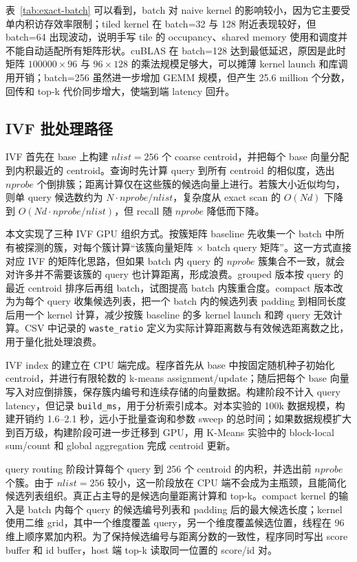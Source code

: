 \documentclass[10pt,a4paper]{article}
\begin{document}
表~\ref{tab:exact-batch} 可以看到，batch 对 naive kernel 的影响较小，因为它主要受单内积访存效率限制；tiled kernel 在 batch=32 与 128 附近表现较好，但 batch=64 出现波动，说明手写 tile 的 occupancy、shared memory 使用和调度并不能自动适配所有矩阵形状。cuBLAS 在 batch=128 达到最低延迟，原因是此时矩阵 $100000\times96$ 与 $96\times128$ 的乘法规模足够大，可以摊薄 kernel launch 和库调用开销；batch=256 虽然进一步增加 GEMM 规模，但产生 25.6 million 个分数，回传和 top-k 代价同步增大，使端到端 latency 回升。

\subsection{IVF 批处理路径}

IVF 首先在 base 上构建 $nlist=256$ 个 coarse centroid，并把每个 base 向量分配到内积最近的 centroid。查询时先计算 query 到所有 centroid 的相似度，选出 $nprobe$ 个倒排簇；距离计算仅在这些簇的候选向量上进行。若簇大小近似均匀，则单 query 候选数约为 $N\cdot nprobe/nlist$，复杂度从 exact scan 的 $O(Nd)$ 下降到 $O(Nd\cdot nprobe/nlist)$，但 recall 随 $nprobe$ 降低而下降。

本文实现了三种 IVF GPU 组织方式。按簇矩阵 baseline 先收集一个 batch 中所有被探测的簇，对每个簇计算``该簇向量矩阵 $\times$ batch query 矩阵''。这一方式直接对应 IVF 的矩阵化思路，但如果 batch 内 query 的 $nprobe$ 簇集合不一致，就会对许多并不需要该簇的 query 也计算距离，形成浪费。grouped 版本按 query 的最近 centroid 排序后再组 batch，试图提高 batch 内簇重合度。compact 版本改为为每个 query 收集候选列表，把一个 batch 内的候选列表 padding 到相同长度后用一个 kernel 计算，减少按簇 baseline 的多 kernel launch 和跨 query 无效计算。CSV 中记录的 \texttt{waste\_ratio} 定义为实际计算距离数与有效候选距离数之比，用于量化批处理浪费。

IVF index 的建立在 CPU 端完成。程序首先从 base 中按固定随机种子初始化 centroid，并进行有限轮数的 k-means assignment/update；随后把每个 base 向量写入对应倒排簇，保存簇内编号和连续存储的向量数据。构建阶段不计入 query latency，但记录 \texttt{build\_ms}，用于分析索引成本。对本实验的 100k 数据规模，构建开销约 1.6--2.1 秒，远小于批量查询和参数 sweep 的总时间；如果数据规模扩大到百万级，构建阶段可进一步迁移到 GPU，用 K-Means 实验中的 block-local sum/count 和 global aggregation 完成 centroid 更新。

query routing 阶段计算每个 query 到 256 个 centroid 的内积，并选出前 $nprobe$ 个簇。由于 $nlist=256$ 较小，这一阶段放在 CPU 端不会成为主瓶颈，且能简化候选列表组织。真正占主导的是候选向量距离计算和 top-k。compact kernel 的输入是 batch 内每个 query 的候选编号列表和 padding 后的最大候选长度；kernel 使用二维 grid，其中一个维度覆盖 query，另一个维度覆盖候选位置，线程在 96 维上顺序累加内积。为了保持候选编号与距离分数的一致性，程序同时写出 score buffer 和 id buffer，host 端 top-k 读取同一位置的 score/id 对。
\end{document}
